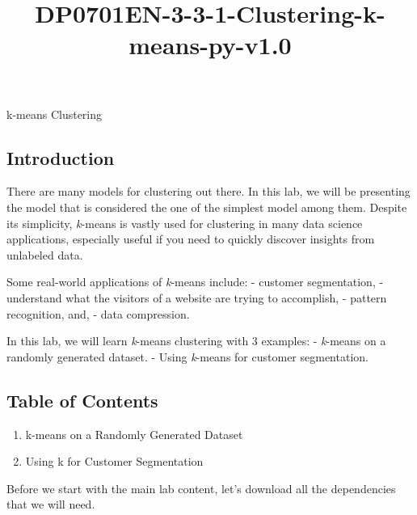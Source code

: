 \documentclass[11pt]{article}
\title{DP0701EN-3-3-1-Clustering-k-means-py-v1.0}
\providecommand{\tightlist}{%
      \setlength{\itemsep}{0pt}\setlength{\parskip}{0pt}}
\begin{document}
    
    \maketitle
    
    

    
    k-means Clustering

    \hypertarget{introduction}{%
\subsection{Introduction}\label{introduction}}

There are many models for clustering out there. In this lab, we will be
presenting the model that is considered the one of the simplest model
among them. Despite its simplicity, \emph{k}-means is vastly used for
clustering in many data science applications, especially useful if you
need to quickly discover insights from unlabeled data.

Some real-world applications of \emph{k}-means include: - customer
segmentation, - understand what the visitors of a website are trying to
accomplish, - pattern recognition, and, - data compression.

In this lab, we will learn \emph{k}-means clustering with 3 examples: -
\emph{k}-means on a randomly generated dataset. - Using \emph{k}-means
for customer segmentation.

    \hypertarget{table-of-contents}{%
\subsection{Table of Contents}\label{table-of-contents}}

\begin{enumerate}
\def\labelenumi{\arabic{enumi}.}
\tightlist
\item
  k-means on a Randomly Generated Dataset\\
\item
  Using k for Customer Segmentation
\end{enumerate}

    Before we start with the main lab content, let's download all the
dependencies that we will need.
\end{document}
